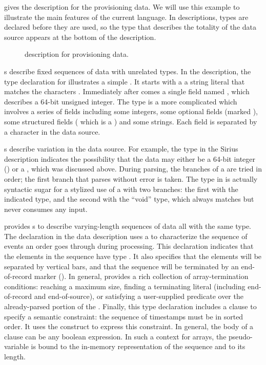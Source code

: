 \documentclass[11pt]{article}
\begin{document}
 gives the \pads{} description for the \dibbler{} 
provisioning data.  We will use this example to illustrate the main 
features of the current
\pads{} language.  In \pads{} descriptions, types are declared before they are used, 
so the type that describes the totality of the data source appears at the bottom of 
the description.


\begin{figure}

\caption{\pads{} description for \dibbler{} provisioning data.}
\label{figure:dibbler}
\end{figure}


s describe fixed sequences of data with unrelated types.
In the \dibbler{} description, the type declaration for
 illustrates a simple . It starts with a 
a string literal that matches the characters .  Immediately after
comes a single field named , which describes a 64-bit unsigned integer.
The type  is a more complicated  which involves
a series of fields including some integers, some optional fields (marked ), some 
structured fields ( which is a ) and some strings.
Each field is separated by a \cd{|} character in the data source.


s describe variation in the data source.  For example, the
 type in the Sirius description indicates the possibility that
the data may either be a 64-bit integer () or a
, which was discussed above.  During parsing, 
the branches of a  are tried in order; the first branch that 
parses without error is taken.  
The  type in  is actually syntactic sugar for a 
stylized use of a  with two branches: the first with the indicated type, 
and the second with the ``void'' type, which  
always matches but never consumes any input.


\pads{} provides s to describe varying-length sequences of data all 
with the same type.  The  declaration in the \dibbler{} data description
uses a  to characterize the sequence of events an
order goes through during processing.  This declaration indicates that the elements
in the sequence have type .  It also specifies that the elements will
be separated by vertical bars, and that the sequence will be terminated by 
an end-of-record marker ().  In general, \pads{} provides a rich collection
of array-termination conditions: reaching a maximum size, finding a terminating
literal (including end-of-record and end-of-source),
or satisfying a user-supplied predicate over the already-parsed portion of 
the .  Finally, this type declaration includes a  clause
to specify a semantic constraint:  
the sequence of timestamps must be in sorted order.
It uses the  construct to express this constraint.
In general, the body of a  clause can be any boolean expression.
In such a context for arrays, the pseudo-variable  is bound to the in-memory representation of the sequence and  to its length.
\end{document}

